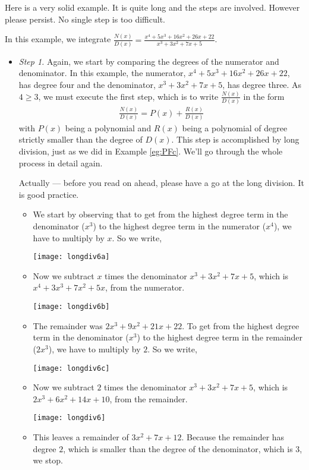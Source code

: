 Here is a very solid example. It is quite long and the steps are involved. However please
persist. No single step is too difficult.
\begin{eg}
                                                     \label{eg:PFc}

\noindent
In this example, we integrate $\frac{N(x)}{D(x)}=
\frac{x^4+5x^3+16x^2+26x+22}{x^3+3x^2+7x+5}$.

\soln
\begin{itemize}
 \item \emph{Step 1.}
Again, we start by comparing the degrees of the numerator and denominator.
In this example, the numerator, $x^4+5x^3+16x^2+26x+22$, has degree four
and the denominator, $x^3+3x^2+7x+5$, has degree  three. As $4\ge 3$, we
must execute the first step, which is to write $\frac{N(x)}{D(x)}$ in the
form
\begin{align*}
\frac{N(x)}{D(x)}=P(x)+\frac{R(x)}{D(x)}
\end{align*}
with $P(x)$ being a polynomial and $R(x)$ being a polynomial of degree
strictly smaller than the degree of $D(x)$. This step is accomplished by
long division, just as we did in Example \ref{eg:PFc}. We'll go through
the whole process in detail again.

Actually --- before you read on ahead, please have a go at the long division. It is
good practice.

\begin{itemize}
 \item We start by observing that to get from the highest degree term in the denominator
($x^3$) to the highest degree term in the numerator ($x^4$), we have to multiply by $x$.
So we write,
\begin{center}
\texttt{[image: longdiv6a]}
\end{center}
\item Now we subtract $x$ times the denominator $x^3+3x^2+7x+5$, which is
$x^4+3x^3+7x^2+5x$, from the numerator.
\begin{center}
\texttt{[image: longdiv6b]}
\end{center}
\item The remainder was $2x^3+9x^2+21x+22$. To get from the
highest degree term in the denominator ($x^3$) to the highest degree term
in the remainder ($2x^3$), we have to multiply by $2$. So we write,
\begin{center}
\texttt{[image: longdiv6c]}
\end{center}
\item Now we subtract $2$ times the denominator $x^3+3x^2+7x+5$, which is
$2x^3+6x^2+14x+10$, from the remainder.
\begin{center}
\texttt{[image: longdiv6]}
\end{center}
\item This leaves a remainder of $3x^2+7x+12$. Because the remainder
has degree $2$, which is smaller than the degree of the denominator, which
is $3$, we stop.


\end{itemize}
\end{itemize}
\end{eg}

